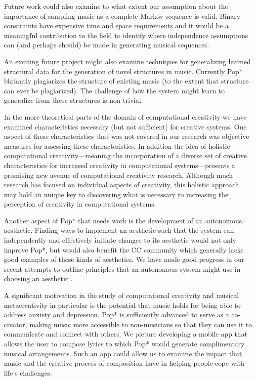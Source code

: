\documentclass[phd,electronic,oneside,twosidetoc,letterpaper,chaptercenter,parttop,lol,lof,lot]{byumsphd}
\begin{document}
Future work could also examine to what extent our assumption about the importance of sampling music as a complete Markov sequence is valid. Binary constraints have expensive time and space requirements and it would be a meaningful contribution to the field to identify where independence assumptions can (and perhaps should) be made in generating musical sequences.

An exciting future project might also examine techniques for generalizing learned structural data for the generation of novel structures in music. Currently Pop* blatantly plagiarizes the structure of existing music (to the extent that structure can ever be plagiarized). The challenge of how the system might learn to generalize from these structures is non-trivial.

In the more theoretical parts of the domain of computational creativity we have examined characteristics necessary (but not sufficient) for creative systems. One aspect of these characteristics that was not covered in our research was objective measures for assessing these characteristics. In addition the idea of holistic computational creativity---meaning the incorporation of a diverse set of creative characteristics for increased creativity in computational systems---presents a promising new avenue of computational creativity research. Although much research has focused on individual aspects of creativity, this holistic approach may hold an unique key to discovering what is necessary to increasing the perception of creativity in computational systems.

Another aspect of Pop* that needs work is the development of an autonomous aesthetic. Finding ways to implement an aesthetic such that the system can independently and effectively initiate changes to its aesthetic would not only improve Pop*, but would also benefit the CC community which generally lacks good examples of these kinds of aesthetics. We have made good progress in our recent attempts to outline principles that an autonomous system might use in choosing an aesthetic \cite{Bodily2018ExplainabilitySystems}.

A significant motivation in the study of computational creativity and musical metacreativity in particular is the potential that music holds for being able to address anxiety and depression. Pop* is sufficiently advanced to serve as a co-creator, making music more accessible to non-musicians so that they can use it to communicate and connect with others. We picture developing a mobile app that allows the user to compose lyrics to which Pop* would generate complimentary musical arrangements. Such an app could allow us to examine the impact that music and the creative process of composition have in helping people cope with life's challenges.
\end{document}
